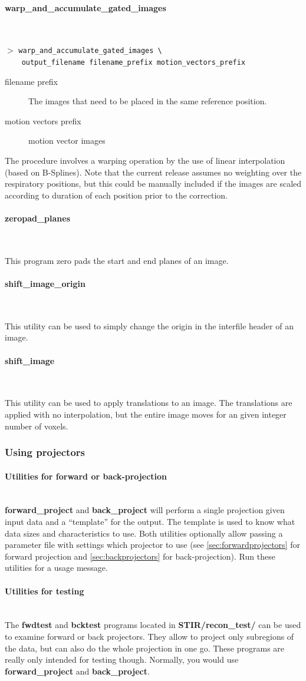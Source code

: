 \documentclass{article}
\newcommand{\subsubsubsection}[1]{\paragraph{#1}\mbox{} \\}
\newcommand{\cmdline}[1]{\par \noindent $>$ \texttt{#1}\par}
\begin{document}
{{{ \subsubsubsection{warp\_and\_accumulate\_gated\_images}
}
\cmdline{warp\_and\_accumulate\_gated\_images \textbackslash \\
\,\,\,\,output\_filename filename\_prefix motion\_vectors\_prefix}

\begin{description}
\item[filename prefix] The images that need to be placed in the
same reference position.

\item[motion vectors prefix]  motion vector images
\end{description}

The
procedure involves a warping operation by the use of linear interpolation (based
on B-Splines). Note that the current release assumes no weighting over the
respiratory positions, but this could be manually included if the images are
scaled according to duration of each position prior to the correction.


{ \subsubsubsection{zeropad\_planes}
}
This program zero pads the start and end planes of an image. 

{ \subsubsubsection{shift\_image\_origin}
}
This utility can be used to simply
change the origin in the interfile header of an image. 

{ \subsubsubsection{shift\_image}
}
This utility can be used to
apply translations to an image. The translations are applied with no
interpolation, but the entire image moves for an given integer number of
voxels. 

\subsubsection{
Using projectors}

\subsubsubsection{
Utilities for forward or back-projection}
\textbf{forward\_project} and \textbf{back\_project} will perform a single projection given
input data and a ``template'' for the output. The template is used to know what data sizes and
characteristics to use. Both utilities optionally allow passing a parameter file with settings
which projector to use (see \ref{sec:forwardprojectors} for forward projection
and \ref{sec:backprojectors} for back-projection).
Run these utilities for a usage message.

\subsubsubsection{Utilities for testing}
The \textbf{fwdtest} and \textbf{bcktest} programs located in \textbf{STIR/recon\_test/} can 
be used to examine forward or back projectors. They allow to 
project only subregions of the data, but can also do the whole 
projection in one go. These programs are really only intended for testing though.
Normally, you would use \textbf{forward\_project} and \textbf{back\_project}.

}}
\end{document}

